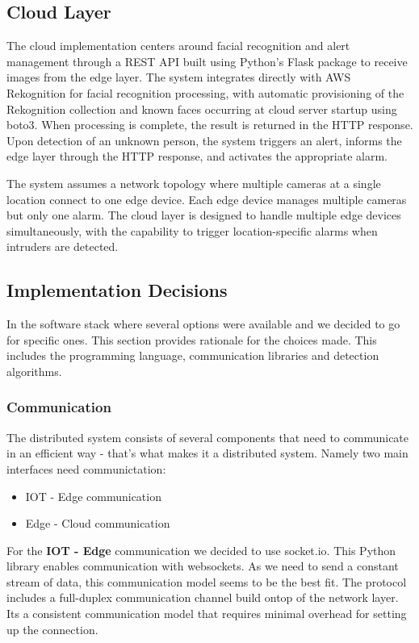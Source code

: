 \documentclass[conference]{IEEEtran}
\begin{document}
\subsection{Cloud Layer}
The cloud implementation centers around facial recognition and alert management through a REST API built using Python's Flask package to receive images from the edge layer. The system integrates directly with AWS Rekognition for facial recognition processing, with automatic provisioning of the Rekognition collection and known faces occurring at cloud server startup using boto3. When processing is complete, the result is returned in the HTTP response. Upon detection of an unknown person, the system triggers an alert, informs the edge layer through the HTTP response, and activates the appropriate alarm.

The system assumes a network topology where multiple cameras at a single location connect to one edge device. Each edge device manages multiple cameras but only one alarm. The cloud layer is designed to handle multiple edge devices simultaneously, with the capability to trigger location-specific alarms when intruders are detected.


\subsection{Implementation Decisions}
In the software stack where several options were available and we decided to go for specific ones. This section provides rationale for the choices made. This includes the programming language, communication libraries and detection algorithms.
\\

\subsubsection{Communication}
The distributed system consists of several components that need to communicate in an efficient way - that's what makes it a distributed system. 
Namely two main interfaces need communictation:
\\
\begin{itemize}
    \item IOT - Edge communication
    \item Edge - Cloud communication
\end{itemize}

\hfill \break
For the \textbf{IOT - Edge} communication we decided to use socket.io. This Python library enables communication with websockets. As we need to send a constant stream of data, this communication model seems to be the best fit. The protocol includes a full-duplex communication channel build ontop of the network layer. Its a consistent communication model that requires minimal overhead for setting up the connection. 
\end{document}

